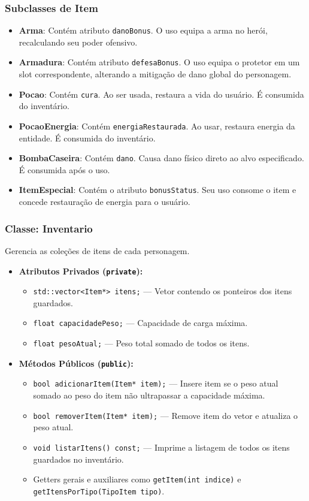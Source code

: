 \documentclass[12pt,a4paper]{article}
\begin{document}
\subsubsection{Subclasses de Item}
\begin{itemize}
    \item \textbf{Arma}: Contém atributo \texttt{danoBonus}. O uso equipa a arma no herói, recalculando seu poder ofensivo.
    \item \textbf{Armadura}: Contém atributo \texttt{defesaBonus}. O uso equipa o protetor em um slot correspondente, alterando a mitigação de dano global do personagem.
    \item \textbf{Pocao}: Contém \texttt{cura}. Ao ser usada, restaura a vida do usuário. É consumida do inventário.
    \item \textbf{PocaoEnergia}: Contém \texttt{energiaRestaurada}. Ao usar, restaura energia da entidade. É consumida do inventário.
    \item \textbf{BombaCaseira}: Contém \texttt{dano}. Causa dano físico direto ao alvo especificado. É consumida após o uso.
    \item \textbf{ItemEspecial}: Contém o atributo \texttt{bonusStatus}. Seu uso consome o item e concede restauração de energia para o usuário.
\end{itemize}

\subsubsection{Classe: Inventario}
Gerencia as coleções de itens de cada personagem.
\begin{itemize}
    \item \textbf{Atributos Privados (\texttt{private}):}
    \begin{itemize}
        \item \texttt{std::vector<Item*> itens;} --- Vetor contendo os ponteiros dos itens guardados.
        \item \texttt{float capacidadePeso;} --- Capacidade de carga máxima.
        \item \texttt{float pesoAtual;} --- Peso total somado de todos os itens.
    \end{itemize}
    \item \textbf{Métodos Públicos (\texttt{public}):}
    \begin{itemize}
        \item \texttt{bool adicionarItem(Item* item);} --- Insere item se o peso atual somado ao peso do item não ultrapassar a capacidade máxima.
        \item \texttt{bool removerItem(Item* item);} --- Remove item do vetor e atualiza o peso atual.
        \item \texttt{void listarItens() const;} --- Imprime a listagem de todos os itens guardados no inventário.
        \item Getters gerais e auxiliares como \texttt{getItem(int indice)} e \texttt{getItensPorTipo(TipoItem tipo)}.
    \end{itemize}
\end{itemize}
\end{document}
